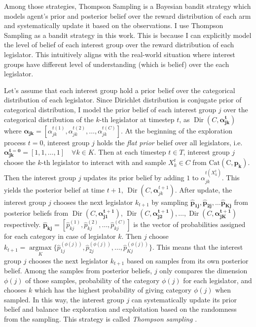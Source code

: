 \documentclass{article}
\begin{document}
Among those strategies,
Thompson Sampling is a Bayesian bandit strategy 
which models agent's prior and posterior belief over the reward distribution of each arm 
and systematically update it based on the observations.
I use Thompson Sampling as a bandit strategy in this work. 
This is because I can explicitly model the level of belief of each interest group over the reward distribution of each legislator.
This intuitively aligns with the real-world situation where 
interest groups have different level of understanding (which is belief) over the each legislator.



Let's assume that 
each interest group
hold a prior belief over the 
categorical distribution of each legislator.
Since Dirichlet distribution is conjugate prior of categorical distribution,
I model the prior belief of each interest group $j$ over the categorical distribution of the $k$-th legislator at timestep $t$, as
$\operatorname{Dir}(C, \mathbf{\alpha^t_{jk}})$ where 
$\mathbf{\alpha_{jk}} = [\alpha_{jk}^{t(1)}, \alpha_{jk}^{t(2)}, \hdots, \alpha_{jk}^{t(C)}]$.
At the beginning of the exploration process $t=0$, interest group $j$ 
holds the \textit{flat prior} belief over all legislators, i.e. $\mathbf{\alpha^{t=0}_{jk}} = [1, 1, \hdots, 1]\quad \forall k \in K$.
Then at each timestep $t\in T$, interest group $j$ choose the $k$-th legislator to 
interact with and sample $X_k^t \in C$ from $\operatorname{Cat(C, \mathbf{p_k})}$.
Then the interest group $j$ updates its prior belief by adding $1$ to $\alpha_{jk}^{t(X_k^t)}$. 
This yields the posterior belief at time $t+1$, $\operatorname{Dir}(C, \mathbf{\alpha}^{t+1}_{jk})$.
After update, the interest group $j$ chooses the next legislator $k_{t+1}$ 
by sampling $\mathbf{\hat{p}_{1j}}, \mathbf{\hat{p}_{2j}}, \hdots \mathbf{\hat{p}_{Kj}}$ from posterior beliefs 
from $\operatorname{Dir}(C, \mathbf{\alpha^{t+1}_{j1}})$,  $\operatorname{Dir}(C, \mathbf{\alpha^{t+1}_{j2}}), \hdots, \operatorname{Dir}(C, \mathbf{\alpha^{t+1}_{jK}})$ respectively.
$\mathbf{\hat{p}_{kj}}=[\hat{p}^{(1)}_{kj}, \hat{p}^{(2)}_{kj}, \hdots, \hat{p}^{(C)}_{kj}]$ is the vector of probabilities assigned for each category in case of legislator $k$.
Then $j$ choose $k_{t+1} = \underset{K}{\operatorname{argmax}}\{\hat{p}^{(\phi(j))}_{1j}, \hat{p}^{(\phi(j))}_{2j}, \hdots, \hat{p}^{(\phi(j))}_{Kj}\}$.
This means that the interest group $j$ chooses the next legislator $k_{t+1}$ 
based on samples from its own posterior belief.
Among the samples from posterior beliefs, $j$ only compares the 
dimension $\phi(j)$ of those samples,
probability of the category $\phi(j)$ for each legislator,
and chooses $k$ which has the highest probability of giving category $\phi(j)$ when sampled.
In this way, the interest group $j$ can systematically update
its prior belief and
balance the exploration and exploitation based on the 
randomness from the sampling. 
This strategy is called \textit{Thompson sampling} \citep{tom}.
\end{document}
